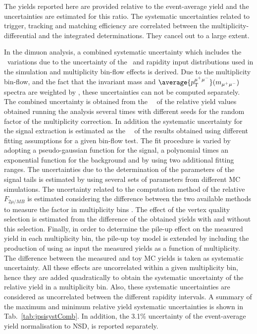 The yields reported here are provided relative to the event-average yield and the uncertainties are estimated for this ratio. The systematic uncertainties related to trigger, tracking and matching efficiency are correlated between the multiplicity-differential and the integrated determinations. They cancel out to a large extent. 

In the dimuon analysis, a combined systematic uncertainty which includes the \acef ~variations due to the uncertainty of the \jpsi \pt ~and rapidity input distributions used in the simulation and multiplicity bin-flow effects is derived. Due to the multiplicity bin-flow, and the fact that the invariant mass and $\average{p_{\rm{T}}^{\mu^{+}\mu^{-}}} (m_{\mu^{+}\mu^{-}})$ spectra are weighted by \acef, these uncertainties can not be computed separately. The combined uncertainty is obtained from the \rms ~~of the relative yield values obtained running the analysis several times with different seeds for the random factor of the multiplicity correction. In addition the systematic uncertainty for the signal extraction is estimated as the \rms ~~of the results obtained using different fitting assumptions for a given bin-flow test. 
The fit procedure is varied by adopting a pseudo-gaussian function for the signal, a polynomial times an exponential function for the background and by using two additional fitting ranges. The uncertainties due to the determination of the parameters of the signal tails is estimated by using several sets of parameters from different MC simulations. 
The uncertainty related to the computation method of the relative $F_{2\mu / MB}$ is estimated considering the difference between the two available methods to measure the factor in multiplicity bins \cite{Adam:2015jsa}. 
The effect of the vertex quality selection is estimated from the difference of the obtained yields with and without this selection. Finally, in order to determine the pile-up effect on the measured yield in each multiplicity bin, the pile-up toy model is extended by including the production of \jpsi using as input the measured yields as a function of multiplicity. The difference between the measured and toy MC yields is taken as systematic uncertainty. All these effects are uncorrelated within a given multiplicity bin, hence they are added quadratically to obtain the systematic uncertainty of the relative yield in a multiplicity bin. Also, these systematic uncertainties are considered as uncorrelated between the different rapidity intervals. A summary of the maximum and minimum relative yield systematic uncertainties is shown in Tab.~\ref{tab:jpsisystComb}. In addition, the 3.1\% uncertainty of the event-average yield normalisation to NSD, is reported separately. 


